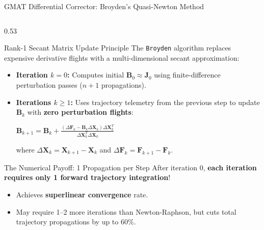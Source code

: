 \documentclass[aspectratio=169, 10pt]{beamer}
\begin{document}
\begin{frame}{GMAT Differential Corrector: Broyden's Quasi-Newton Method}
    \begin{columns}[t]
        \begin{column}{0.53\textwidth}
            \begin{block}{Rank-1 Secant Matrix Update Principle}
                \scriptsize
                The \texttt{Broyden} algorithm replaces expensive derivative flights with a multi-dimensional secant approximation:
                \begin{itemize}\setlength{\itemsep}{1.2pt}\setlength{\topsep}{0pt}
                    \item \textbf{Iteration $k = 0$:} Computes initial $\mathbf{B}_0 \approx \mathbf{J}_0$ using finite-difference perturbation passes ($n+1$ propagations).
                    \item \textbf{Iterations $k \ge 1$:} Uses trajectory telemetry from the previous step to update $\mathbf{B}_k$ with \textbf{zero perturbation flights}:
                    \par\vspace{1pt}
                    {\centering $\displaystyle \mathbf{B}_{k+1} = \mathbf{B}_k + \frac{\left(\Delta \mathbf{F}_k - \mathbf{B}_k \Delta \mathbf{X}_k\right) \Delta \mathbf{X}_k^T}{\Delta \mathbf{X}_k^T \Delta \mathbf{X}_k}$\par}
                    where $\Delta \mathbf{X}_k = \mathbf{X}_{k+1} - \mathbf{X}_k$ and $\Delta \mathbf{F}_k = \mathbf{F}_{k+1} - \mathbf{F}_k$.
                \end{itemize}
            \end{block}

            \vspace{-0.08cm}

            \begin{exampleblock}{The Numerical Payoff: 1 Propagation per Step}
                \scriptsize
                After iteration 0, \textbf{each iteration requires only 1 forward trajectory integration}!
                \begin{itemize}\setlength{\itemsep}{0.8pt}
                    \item Achieves \textbf{superlinear convergence} rate.
                    \item May require 1--2 more iterations than Newton-Raphson, but cuts total trajectory propagations by up to $60\%$.
                \end{itemize}
            \end{exampleblock}
        \end{column}


\end{columns}
\end{frame}
\end{document}
